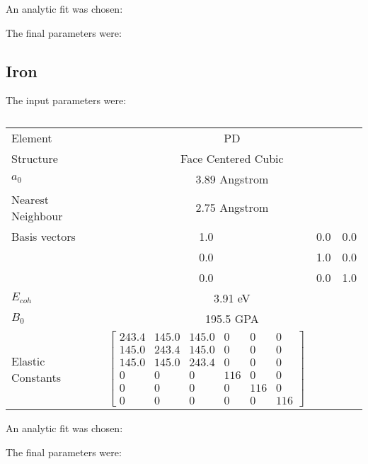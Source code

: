 An analytic fit was chosen:


The final parameters were:





\subsection{Iron}


The input parameters were:

\begin{table}[ht]
\begin{tabular}{lccc}
\hline
Element & \multicolumn{3}{c}{PD}\\
Structure             & \multicolumn{3}{c}{Face Centered Cubic}\\
$a_0$                 & \multicolumn{3}{c}{3.89 Angstrom \cite{webelementspd}}\\
Nearest Neighbour     & \multicolumn{3}{c}{2.75 Angstrom \cite{webelementspd}}\\
Basis vectors         & 1.0 & 0.0 & 0.0 \\
                      & 0.0 & 1.0 & 0.0 \\
                      & 0.0 & 0.0 & 1.0         \\
$E_{coh}$             & \multicolumn{3}{c}{3.91 eV \cite{semiempiricalpots}}   \\
$B_0$                 & \multicolumn{3}{c}{195.5 GPA \cite{semiempiricalpots}}   \\
Elastic Constants     & $\begin{bmatrix} 243.4 & 145.0 & 145.0 & 0 & 0 & 0 \\ 145.0 & 243.4 & 145.0 & 0 & 0 & 0 \\ 145.0 & 145.0 & 243.4 & 0 & 0 & 0 \\ 0 & 0 & 0 & 116 & 0 & 0 \\ 0 & 0 & 0 & 0 & 116 & 0 \\ 0 & 0 & 0 & 0 & 0 & 116 \end{bmatrix}$ \\
\hline
\end{tabular}
\label{tab:multicol}
\caption{}
\end{table}

An analytic fit was chosen:


The final parameters were:






















